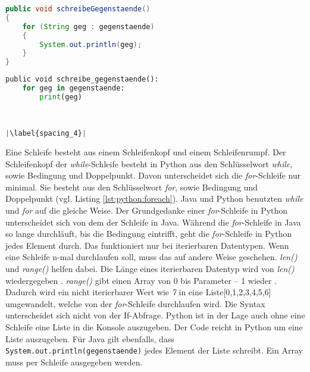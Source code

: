 \begin{minipage}{.5\linewidth}
\begin{lstlisting}[language=java,caption={foreach-Schleife Java},captionpos=b,label={lst:java:foreach},frame=none]
public void schreibeGegenstaende()
{
    for (String geg : gegenstaende)
    {
        System.out.println(geg);
    }
}
\end{lstlisting}
\end{minipage}
\begin{minipage}{.5\linewidth}
\begin{lstlisting}[language=python,caption={foreach-Schleife Python},captionpos=b,label={lst:python:foreach},frame=l,escapechar=|]
public void schreibe_gegenstaende():
    for geg in gegenstaende:
        print(geg)
        
        

|\label{spacing_4}|
\end{lstlisting}
\end{minipage}

Eine Schleife besteht aus einem Schleifenkopf und einem Schleifenrumpf. Der Schleifenkopf der \textit{while}-Schleife besteht in Python aus den Schlüsselwort \textit{while}, sowie Bedingung und Doppelpunkt. Davon unterscheidet sich die \textit{for}-Schleife nur minimal. Sie besteht aus den Schlüsselwort \textit{for}, sowie Bedingung und Doppelpunkt (vgl. Listing \ref{lst:python:foreach}). Java und Python benutzten \textit{while} und \textit{for} auf die gleiche Weise. Der Grundgedanke einer \textit{for}-Schleife in Python unterscheidet sich von dem der Schleife in Java. Während die \textit{for}-Schleife in Java so lange durchläuft, bis die Bedingung eintrifft, geht die \textit{for}-Schleife in Python jedes Element durch. Das funktioniert nur bei iterierbaren Datentypen. Wenn eine Schleife n-mal durchlaufen soll, muss das auf andere Weise geschehen. \textit{len()} und \textit{range()} helfen dabei. Die Länge eines iterierbaren Datentyp wird von \textit{len()} wiedergegeben \cite{w3school_len}. \textit{range()} gibt einen Array von 0 bis Parameter – 1 wieder \cite{w3school_range}. Dadurch wird ein nicht iterierbarer Wert wie \textit{7} in eine Liste[0,1,2,3,4,5,6] umgewandelt, welche von der \textit{for}-Schleife durchlaufen wird. Die Syntax unterscheidet sich nicht von der If-Abfrage. Python ist in der Lage auch ohne eine Schleife eine Liste in die Konsole auszugeben. Der Code  reicht in Python um eine Liste auszugeben. Für Java gilt ebenfalls, dass \texttt{System.out.println(gegenstaende)} jedes Element der Liste schreibt. Ein Array muss per Schleife ausgegeben werden. \cite{Louis:2010}\cite{Python3:Buch}
\par
